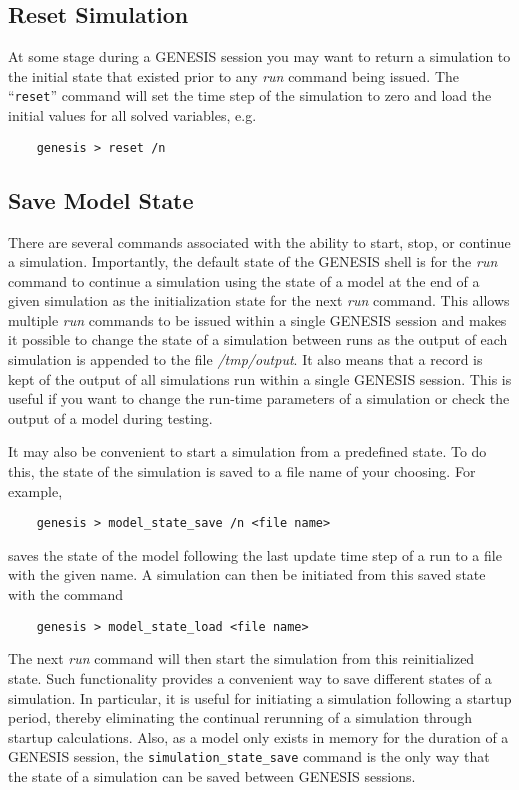 \documentclass[12pt]{article}
\begin{document}
\subsection*{Reset Simulation}

At some stage during a GENESIS session you may want to return a simulation to the initial state that existed prior to any {\it run} command being issued. The ``{\tt reset}'' command will set the time step of the simulation to zero and load the initial values for all solved variables, e.g.
\begin{verbatim}
    genesis > reset /n
\end{verbatim}

\subsection*{Save Model State}

There are several commands associated with the ability to start, stop, or continue a simulation. Importantly, the default state of the GENESIS shell is for the {\it run} command to continue a simulation using the state of a model at the end of a given simulation as the initialization state for the next {\it run} command. This allows multiple {\it run} commands to be issued within a single GENESIS session and makes it possible to change the state of a simulation between runs as the output of each simulation is appended to the file {\it /tmp/output}. It also means that a record is kept of the output of all simulations run within a single GENESIS session. This is useful if you want to change the run-time parameters of a simulation or check the output of a model during testing.

It may also be convenient to start a simulation from a predefined state. To do this, the state of the simulation is saved to a file name of your choosing. For example,
\begin{verbatim}
    genesis > model_state_save /n <file name>
\end{verbatim}
saves the state of the model following the last update time step of a run to a file with the given name. A simulation can then be initiated from this saved state with the command 
\begin{verbatim}
    genesis > model_state_load <file name>
\end{verbatim}
The next {\it run} command will then start the simulation from this reinitialized state. Such functionality provides a convenient way to save different states of a simulation. In particular, it is useful for initiating a simulation following a startup period, thereby eliminating the continual rerunning of a simulation through startup calculations. Also, as a model only exists in memory for the duration of a GENESIS session, the {\tt simulation\_state\_save} command  is the only way that the state of a simulation can be saved between GENESIS sessions.
\end{document}
